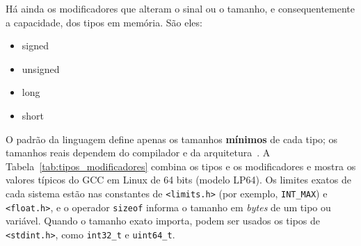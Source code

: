 \documentclass[11pt,fleqn]{book} %
\begin{document}
Há ainda os modificadores que alteram o sinal ou o tamanho, e consequentemente a capacidade, dos tipos em memória. São eles:

\begin{itemize}
	\item signed
	\item unsigned
	\item long
	\item short
\end{itemize}

O padrão da linguagem define apenas os tamanhos \textbf{mínimos} de cada tipo; os tamanhos reais dependem do compilador e da arquitetura~\cite{isoc17}.
A Tabela~\ref{tab:tipos_modificadores} combina os tipos e os modificadores e mostra os valores típicos do GCC em Linux de 64 bits (modelo LP64).
Os limites exatos de cada sistema estão nas constantes de \texttt{<limits.h>} (por exemplo, \texttt{INT\_MAX}) e \texttt{<float.h>}, e o operador \texttt{sizeof} informa o tamanho em \textit{bytes} de um tipo ou variável.
Quando o tamanho exato importa, podem ser usados os tipos de \texttt{<stdint.h>}, como \texttt{int32\_t} e \texttt{uint64\_t}.
\end{document}
